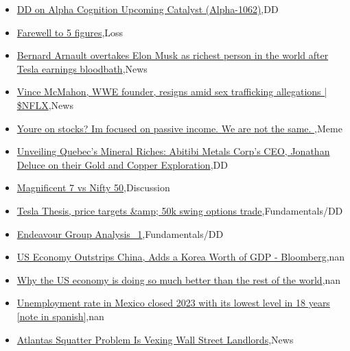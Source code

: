 \documentclass{article}%
\begin{document}
%
\begin{itemize}%
\item%
\href{https://reddit.com/r/wallstreetbets/comments/1ac9vdu/dd\_on\_alpha\_cognition\_upcoming\_catalyst\_alpha1062/}{DD on Alpha Cognition Upcoming Catalyst (Alpha-1062)},DD%
\item%
\href{https://reddit.com/r/wallstreetbets/comments/1ac3si4/farewell\_to\_5\_figures/}{Farewell to 5 figures},Loss%
\item%
\href{https://reddit.com/r/wallstreetbets/comments/1ac2wa7/bernard\_arnault\_overtakes\_elon\_musk\_as\_richest/}{Bernard Arnault overtakes Elon Musk as richest person in the world after Tesla earnings bloodbath},News%
\item%
\href{https://reddit.com/r/wallstreetbets/comments/1ac2gdc/vince\_mcmahon\_wwe\_founder\_resigns\_amid\_sex/}{Vince McMahon, WWE founder, resigns amid sex trafficking allegations | \$NFLX},News%
\item%
\href{https://reddit.com/r/wallstreetbets/comments/1ac1rfu/youre\_on\_stocks\_im\_focused\_on\_passive\_income\_we/}{Youre on stocks? Im focused on passive income. We are not the same. },Meme%
\item%
\href{https://reddit.com/r/Baystreetbets/comments/1abycdr/unveiling\_quebecs\_mineral\_riches\_abitibi\_metals/}{Unveiling Quebec's Mineral Riches: Abitibi Metals Corp's CEO, Jonathan Deluce on their Gold and Copper Exploration},DD%
\item%
\href{https://reddit.com/r/StockMarket/comments/1abmzu2/magnificent\_7\_vs\_nifty\_50/}{Magnificent 7 vs Nifty 50},Discussion%
\item%
\href{https://reddit.com/r/StockMarket/comments/1abdfmn/tesla\_thesis\_price\_targets\_50k\_swing\_options\_trade/}{Tesla Thesis, price targets \&amp; 50k swing options trade},Fundamentals/DD%
\item%
\href{https://reddit.com/r/StockMarket/comments/1abhjda/endeavour\_group\_analysis\_1/}{Endeavour Group Analysis\_1},Fundamentals/DD%
\item%
\href{https://reddit.com/r/Economics/comments/1ac21au/us\_economy\_outstrips\_china\_adds\_a\_korea\_worth\_of/}{US Economy Outstrips China, Adds a Korea Worth of GDP - Bloomberg},nan%
\item%
\href{https://reddit.com/r/Economics/comments/1abtgqs/why\_the\_us\_economy\_is\_doing\_so\_much\_better\_than/}{Why the US economy is doing so much better than the rest of the world},nan%
\item%
\href{https://reddit.com/r/Economics/comments/1abs3fv/unemployment\_rate\_in\_mexico\_closed\_2023\_with\_its/}{Unemployment rate in Mexico closed 2023 with its lowest level in 18 years [note in spanish]},nan%
\item%
\href{https://reddit.com/r/Economics/comments/1abq0lb/atlantas\_squatter\_problem\_is\_vexing\_wall\_street/}{Atlantas Squatter Problem Is Vexing Wall Street Landlords},News%
\end{itemize}%
\end{document}
